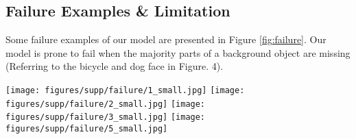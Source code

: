 \documentclass[oribibl]{llncs}  \usepackage[width=122mm,left=12mm,paperwidth=146mm,height=193mm,top=12mm,paperheight=217mm]{geometry}
\begin{document}
\subsection*{Failure Examples \& Limitation}
Some failure examples of our model are presented in Figure \ref{fig:failure}. Our model is prone to fail when the majority parts of a background object are missing (Referring to the bicycle and dog face in Figure. 4). 

\begin{figure*}[t]
\begin{center}
\texttt{[image: figures/supp/failure/1\_small.jpg]}
\texttt{[image: figures/supp/failure/2\_small.jpg]}
\texttt{[image: figures/supp/failure/3\_small.jpg]}
\texttt{[image: figures/supp/failure/5\_small.jpg]}
\subfloat[Original]{\hspace{.17\linewidth}}
\subfloat[Input]{\hspace{.16\linewidth}}
\subfloat[Output]{\hspace{.17\linewidth}}
\subfloat[Original]{\hspace{.17\linewidth}}
\subfloat[Input]{\hspace{.16\linewidth}}
\subfloat[Output]{\hspace{.17\linewidth}}
\caption{Failure examples of our model.}
\label{fig:failure}
\end{center}
\end{figure*} 
\end{document}
